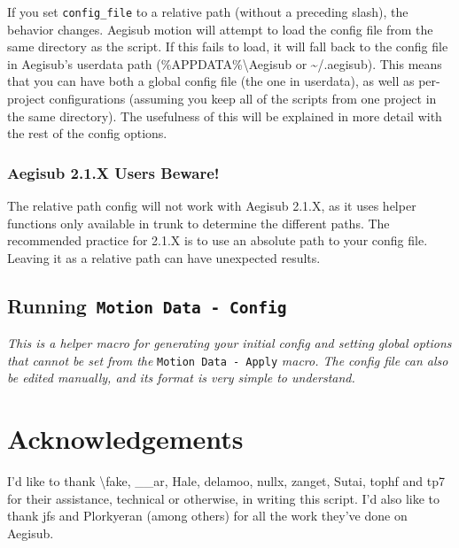 ﻿\documentclass[a4paper,12pt]{article}
\begin{document}
  If you set {\tt{}config\_file} to a relative path (without a preceding slash), the behavior changes. Aegisub motion will attempt to load the config file from the same directory as the script. If this fails to load, it will fall back to the config file in Aegisub's userdata path (\%APPDATA\%\textbackslash{}Aegisub or \textasciitilde/.aegisub). This means that you can have both a global config file (the one in userdata), as well as per-project configurations (assuming you keep all of the scripts from one project in the same directory). The usefulness of this will be explained in more detail with the rest of the config options.
  
  \subsubsection*{Aegisub 2.1.X Users Beware!}
  The relative path config will not work with Aegisub 2.1.X, as it uses helper functions only available in trunk to determine the different paths. The recommended practice for 2.1.X is to use an absolute path to your config file. Leaving it as a relative path can have unexpected results.
  
  \subsection{Running{\tt{} Motion Data - Config}}
  \emph{This is a helper macro for generating your initial config and setting global options that cannot be set from the }{\tt Motion Data - Apply}\emph{ macro. The config file can also be edited manually, and its format is very simple to understand.}
  
  
    
  \section*{Acknowledgements}
  I'd like to thank \textbackslash{}fake, \_\_ar, Hale, delamoo, nullx, zanget, Sutai, tophf and tp7 for their assistance, technical or otherwise, in writing this script. I'd also like to thank jfs and Plorkyeran (among others) for all the work they've done on Aegisub.  
\end{document}
